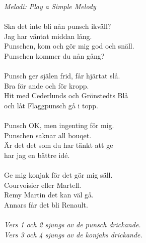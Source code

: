 {\footnotesize\textit{Melodi: Play a Simple Melody}}\\
\\
Ska det inte bli nån punsch ikväll?\\
Jag har väntat middan lång.\\
Punschen, kom och gör mig god och snäll.\\
Punschen kommer du nån gång?\\
\\
Punsch ger själen frid, får hjärtat slå.\\
Bra för ande och för kropp.\\
Hit med Cederlunds och Grönstedts Blå\\
och låt Flaggpunsch gå i topp.\\
\\
Punsch OK, men ingenting för mig.\\
Punschen saknar all bouqet.\\
Är det det som du har tänkt att ge\\
har jag en bättre idé.\\
\\
Ge mig konjak för det gör mig säll.\\
Courvoisier eller Martell.\\
Remy Martin det kan väl gå.\\
Annars får det bli Renault.\\
\\
{\footnotesize\textit{Vers 1 och 2 sjungs av de punsch drickande.\\Vers 3 och 4 sjungs av de konjaks drickande.}}
